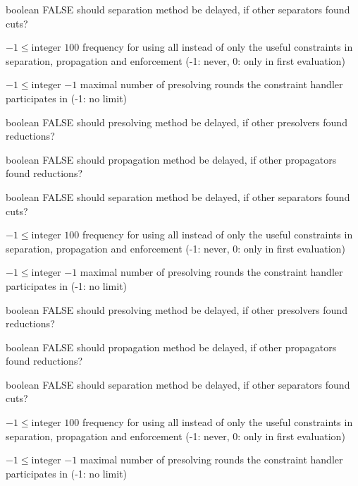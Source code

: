 %
{boolean}%
{FALSE}%
{should separation method be delayed, if other separators found cuts?}%
{}

%
{$-1\leq\textrm{integer}$}%
{$100$}%
{frequency for using all instead of only the useful constraints in separation, propagation and enforcement (-1: never, 0: only in first evaluation)}%
{}

%
{$-1\leq\textrm{integer}$}%
{$-1$}%
{maximal number of presolving rounds the constraint handler participates in (-1: no limit)}%
{}

%
{boolean}%
{FALSE}%
{should presolving method be delayed, if other presolvers found reductions?}%
{}

%
{boolean}%
{FALSE}%
{should propagation method be delayed, if other propagators found reductions?}%
{}

%
{boolean}%
{FALSE}%
{should separation method be delayed, if other separators found cuts?}%
{}

%
{$-1\leq\textrm{integer}$}%
{$100$}%
{frequency for using all instead of only the useful constraints in separation, propagation and enforcement (-1: never, 0: only in first evaluation)}%
{}

%
{$-1\leq\textrm{integer}$}%
{$-1$}%
{maximal number of presolving rounds the constraint handler participates in (-1: no limit)}%
{}

%
{boolean}%
{FALSE}%
{should presolving method be delayed, if other presolvers found reductions?}%
{}

%
{boolean}%
{FALSE}%
{should propagation method be delayed, if other propagators found reductions?}%
{}

%
{boolean}%
{FALSE}%
{should separation method be delayed, if other separators found cuts?}%
{}

%
{$-1\leq\textrm{integer}$}%
{$100$}%
{frequency for using all instead of only the useful constraints in separation, propagation and enforcement (-1: never, 0: only in first evaluation)}%
{}

%
{$-1\leq\textrm{integer}$}%
{$-1$}%
{maximal number of presolving rounds the constraint handler participates in (-1: no limit)}%
{}

